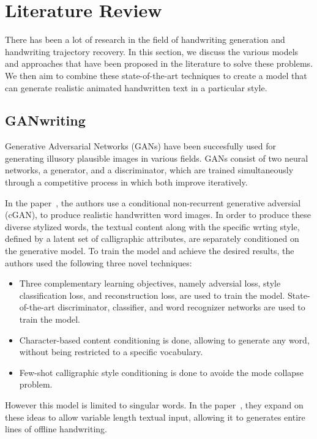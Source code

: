 \documentclass[10pt,twocolumn,letterpaper]{article}
\begin{document}
\section{Literature Review}
\label{sec: Lit Rev}
There has been a lot of research in the field of handwriting generation and handwriting trajectory recovery. In this section, we discuss the various models and approaches that have been proposed in the literature to solve these problems. We then aim to combine these state-of-the-art techniques to create a model that can generate realistic animated handwritten text in a particular style.


\subsection{GANwriting}
\label{subsec: GANWriting}
Generative Adversarial Networks (GANs) have been succesfully used for generating illusory plausible images in various fields. GANs consist of two neural networks, a generator, and a discriminator, which are trained simultaneously through a competitive process in which both improve iteratively. 

In the paper~\cite{GAN-1}, the authors use a conditional non-recurrent generative adversial (cGAN), to produce realistic handwritten word images. In order to produce these diverse stylized words, the textual content along with the specific wrting style, defined by a latent set of calligraphic attributes, are separately conditioned on the generative model. To train the model and achieve the desired results, the authors used the following three novel techniques:
\begin{itemize}
    \item Three complementary learning objectives, namely adversial loss, style classification loss, and reconstruction loss, are used to train the model. State-of-the-art discriminator, classifier, and word recognizer networks are used to train the model.
    \item Character-based content conditioning is done, allowing to generate any word, without being restricted to a specific vocabulary.
    \item Few-shot calligraphic style conditioning is done to avoide the mode collapse problem.
\end{itemize}


However this model is limited to singular words. In the paper~\cite{GAN-2}, they expand on these ideas to allow variable length  textual input, allowing it to generates entire lines of offline handwriting.
\end{document}
